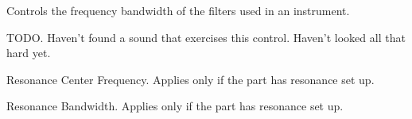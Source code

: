    Controls the frequency bandwidth of the filters used in an instrument.

   TODO.
   Haven't found a sound that exercises this control.
   Haven't looked all that hard yet.

   Resonance Center Frequency.
   Applies only if the part has resonance set up.

   Resonance Bandwidth.
   Applies only if the part has resonance set up.

